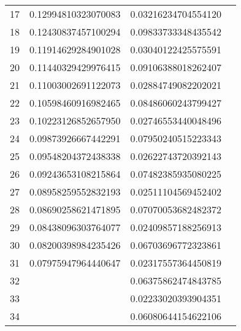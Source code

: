 \begin{table}[]
\begin{center}
\begin{tabular}{|c|c|c|c|}
17 & 0.12994810323070083 & 0.03216234704554120 &                      \\
18 & 0.12430837457100294 & 0.09833733348435542 &                      \\
19 & 0.11914629284901028 & 0.03040122425575591 &                      \\
20 & 0.11440329429976415 & 0.09106388018262407 &                      \\
21 & 0.11003002691122073 & 0.02884749082202021 &                      \\
22 & 0.10598460916982465 & 0.08486060243799427 &                      \\
23 & 0.10223126852657950 & 0.02746553440048496 &                      \\
24 & 0.09873926667442291 & 0.07950240515223343 &                      \\
25 & 0.09548204372438338 & 0.02622743720392143 &                      \\
26 & 0.09243653108215864 & 0.07482385935080225 &                      \\
27 & 0.08958259552832193 & 0.02511104569452402 &                      \\
28 & 0.08690258621471895 & 0.07070053682482372 &                      \\
29 & 0.08438096303764077 & 0.02409857188256913 &                      \\
30 & 0.08200398984235426 & 0.06703696772323861 &                      \\
31 & 0.07975947964440647 & 0.02317557364450819 &                      \\
32 &                     & 0.06375862474843785 &                      \\
33 &                     & 0.02233020393904351 &                      \\
34 &                     & 0.06080644154622106 &                      \\
\hline
\end{tabular}
\end{center}
\end{table}

